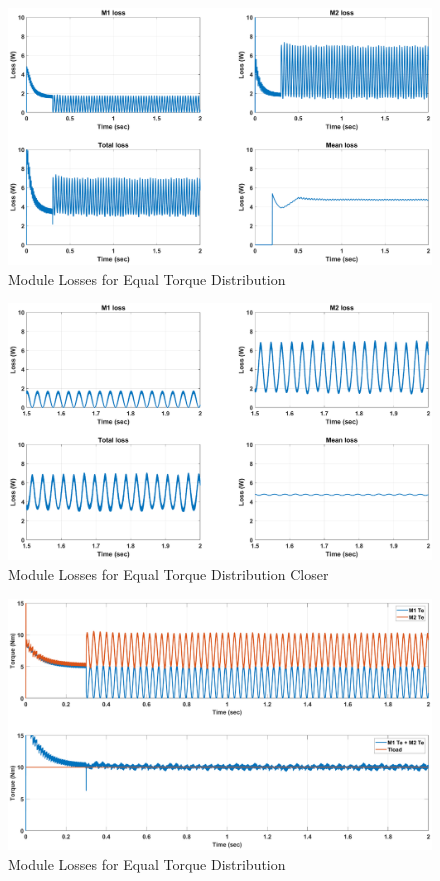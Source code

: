 \documentclass{article}
\begin{document}
\begin{figure}[H]
\centering
\includegraphics[scale=0.35]{SimulationResults/EqualTorqueShare/Loss.eps}
\caption{Module Losses for Equal Torque Distribution}
\label{fig:LossEqual}
\end{figure}

\begin{figure}[H]
\centering
\includegraphics[scale=0.35]{SimulationResults/EqualTorqueShare/Loss_closer.eps}
\caption{Module Losses for Equal Torque Distribution Closer}
\label{fig:LossEqualCloser}
\end{figure}

\begin{figure}[H]
\centering
\includegraphics[scale=0.35]{SimulationResults/EqualTorqueShare/Torques.eps}
\caption{Module Losses for Equal Torque Distribution}
\label{fig:LossEqual}
\end{figure}
\end{document}
